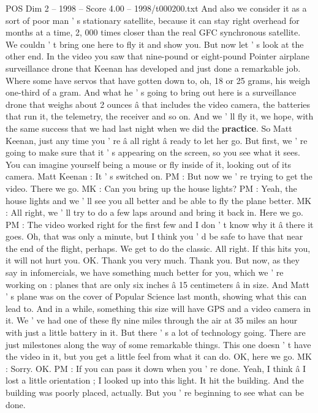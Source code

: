 \begin{textsample}{POS Dim 2 – 1998 – Score 4.00 – 1998/t000200.txt}
And also we consider it as a sort of poor man ' s stationary satellite, because it can stay right overhead for months at a time, 2, 000 times closer than the real GFC synchronous satellite.
We couldn ' t bring one here to fly it and show you.
But now let ' s look at the other end.
In the video you saw that nine-pound or eight-pound Pointer airplane surveillance drone that Keenan has developed and just done a remarkable job.
Where some have servos that have gotten down to, oh, 18 or 25 grams, his weigh one-third of a gram.
And what he ' s going to bring out here is a surveillance drone that weighs about 2 ounces â that includes the video camera, the batteries that run it, the telemetry, the receiver and so on.
And we ' ll fly it, we hope, with the same success that we had last night when we did the \textbf{practice}.
So Matt Keenan, just any time you ' re â all right â ready to let her go.
But first, we ' re going to make sure that it ' s appearing on the screen, so you see what it sees.
You can imagine yourself being a mouse or fly inside of it, looking out of its camera.
Matt Keenan : It ' s switched on.
PM : But now we ' re trying to get the video.
There we go.
MK : Can you bring up the house lights?
PM : Yeah, the house lights and we ' ll see you all better and be able to fly the plane better.
MK : All right, we ' ll try to do a few laps around and bring it back in.
Here we go.
PM : The video worked right for the first few and I don ' t know why it â there it goes.
Oh, that was only a minute, but I think you ' d be safe to have that near the end of the flight, perhaps.
We get to do the classic.
All right.
If this hits you, it will not hurt you.
OK.
Thank you very much.
Thank you.
But now, as they say in infomercials, we have something much better for you, which we ' re working on : planes that are only six inches â 15 centimeters â in size.
And Matt ' s plane was on the cover of Popular Science last month, showing what this can lead to.
And in a while, something this size will have GPS and a video camera in it.
We ' ve had one of these fly nine miles through the air at 35 miles an hour with just a little battery in it.
But there ' s a lot of technology going.
There are just milestones along the way of some remarkable things.
This one doesn ' t have the video in it, but you get a little feel from what it can do.
OK, here we go.
MK : Sorry.
OK.
PM : If you can pass it down when you ' re done.
Yeah, I think â I lost a little orientation ; I looked up into this light.
It hit the building.
And the building was poorly placed, actually.
But you ' re beginning to see what can be done.

\end{textsample}

